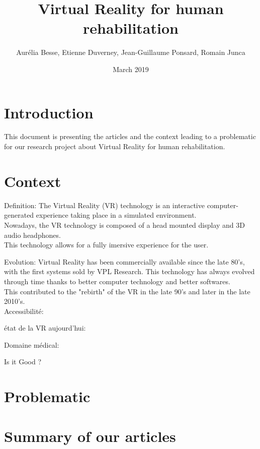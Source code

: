 \documentclass{article}
\title{Virtual Reality for human rehabilitation}
\author{ Aurélia Besse, Etienne Duverney, Jean-Guillaume Ponsard, Romain Junca }
\date{March 2019}
\begin{document}
\maketitle

\section{Introduction}

This document is presenting the articles and the context leading to a problematic for our research project about Virtual Reality for human rehabilitation.


\section{Context}

Definition:
The Virtual Reality (VR) technology is an interactive computer-generated experience taking place in a simulated environment. 
\\
Nowadays, the VR technology is composed of a head mounted display and 3D audio headphones.
\\
This technology allows for a fully imersive experience for the user.

Evolution:
Virtual Reality has been commercially available since the late 80's, with the first systems sold by VPL Research.
This technology has always evolved through time thanks to better computer technology and better softwares.
\\
This contributed to the "rebirth" of the VR in the late 90's and later in the late 2010's.
\\



Accessibilité:


état de la VR aujourd'hui:


Domaine médical:


Is it Good ?


\section{Problematic}


\section{Summary of our articles}
\end{document}
